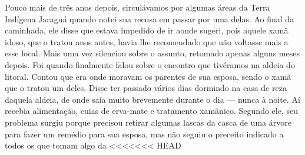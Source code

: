 Pouco mais de três anos depois, circulávamos por algumas áreas da Terra
Indígena Jaraguá quando notei sua recusa em passar por uma delas. Ao
final da caminhada, ele disse que estava impedido de ir aonde sugeri,
pois aquele xamã idoso, que o tratou anos antes, havia lhe recomendado
que não voltasse mais a esse local. Mais uma vez silenciou sobre o
assunto, retomado apenas alguns meses depois. Foi quando finalmente
falou sobre o encontro que tivéramos na aldeia do litoral. Contou que
era onde moravam os parentes de sua esposa, sendo o xamã que o tratou
um deles. Disse ter passado vários dias dormindo na casa de reza
daquela aldeia, de onde saía muito brevemente durante o dia --- nunca à
noite. Aí recebia alimentação, cuias de erva-mate e tratamento
xamânico. Segundo ele, seu problema surgiu porque precisou retirar
algumas lascas da casca de uma árvore para fazer um remédio para sua
esposa, mas não seguiu o preceito indicado a todos os que tomam algo da
<<<<<<< HEAD
